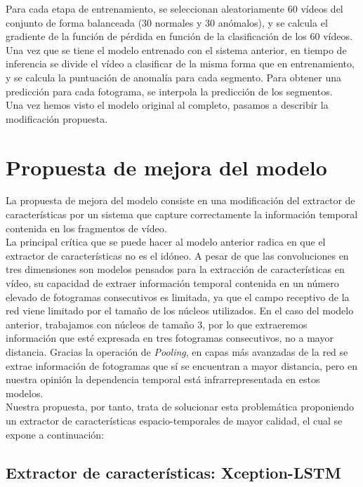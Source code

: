 \documentclass[../main.tex]{memoir}
\begin{document}
Para cada etapa de entrenamiento, se seleccionan aleatoriamente 60
vídeos del conjunto de forma balanceada (30 normales y 30 anómalos), y
se calcula el gradiente de la función de pérdida en función de la
clasificación de los 60 vídeos.\\

Una vez que se tiene el modelo entrenado con el sistema anterior, en
tiempo de inferencia se divide el vídeo a clasificar de la misma forma
que en entrenamiento, y se calcula la puntuación de anomalía para cada
segmento. Para obtener una predicción para cada fotograma, se
interpola la predicción de los segmentos.\\

Una vez hemos visto el modelo original al completo, pasamos a describir
la modificación propuesta.

\section{Propuesta de mejora del modelo}

La propuesta de mejora del modelo consiste en una modificación del
extractor de características por un sistema que capture correctamente
la información temporal contenida en los fragmentos de vídeo.\\

La principal crítica que se puede hacer al modelo anterior radica en
que el extractor de características no es el idóneo. A pesar de que
las convoluciones en tres dimensiones son modelos pensados para la
extracción de características en vídeo, su capacidad de extraer
información temporal contenida en un número elevado de fotogramas
consecutivos es limitada, ya que el campo receptivo de la red viene
limitado por el tamaño de los núcleos utilizados. En el caso del
modelo anterior, trabajamos con núcleos de tamaño 3, por lo que
extraeremos información que esté expresada en tres fotogramas
consecutivos, no a mayor distancia. Gracias la operación de
\textit{Pooling}, en capas más avanzadas de la red se extrae
información de fotogramas que sí se encuentran a mayor distancia, pero
en nuestra opinión la dependencia temporal está infrarrepresentada en
estos modelos.\\

Nuestra propuesta, por tanto, trata de solucionar esta problemática
proponiendo un extractor de características espacio-temporales de
mayor calidad, el cual se expone a continuación:

\subsection{Extractor de características: Xception-LSTM}
\end{document}
